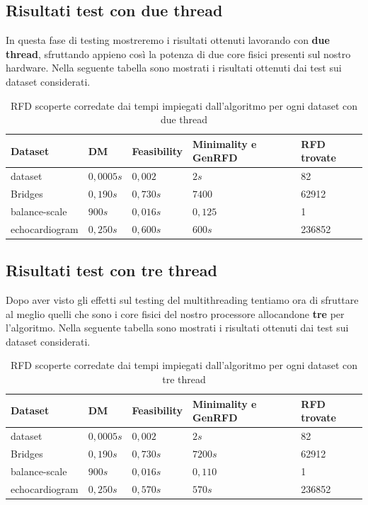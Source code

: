 \subsection{Risultati test con due thread}
In questa fase di testing mostreremo i risultati ottenuti lavorando con \textbf{due thread}, sfruttando appieno così la potenza di due core fisici presenti sul nostro hardware.
Nella seguente tabella sono mostrati i risultati ottenuti dai test sui dataset considerati.
\begin{table}[H]
	\centering
	\begin{tabular}{lllll}
		Dataset & DM & Feasibility & Minimality e GenRFD & RFD trovate \\
		\hline
		dataset& $0,0005s$ & $0,002$ & $2s$ & 82 \\
		Bridges & $0,190s$  & $0,730s$ & $7400$ & 62912 \\
		balance-scale  & $900s$  & $0,016s$ & $0,125$ & 1\\
		echocardiogram  & $0,250s$  & $0,600s$ & $600s$ & 236852\\
		\hline
	\end{tabular}
	\label{risultati_2_thread}
	\caption{RFD scoperte corredate dai tempi impiegati dall'algoritmo per ogni dataset con due thread}
\end{table}
\subsection{Risultati test con tre thread}
Dopo aver visto gli effetti sul testing del multithreading tentiamo ora di sfruttare al meglio quelli che sono i core fisici del nostro processore allocandone \textbf{tre} per l'algoritmo.
Nella seguente tabella sono mostrati i risultati ottenuti dai test sui dataset considerati.
\begin{table}[H]
	\centering
	\begin{tabular}{lllll}
		Dataset & DM & Feasibility & Minimality e GenRFD & RFD trovate \\
		\hline
		dataset& $0,0005s$ & $0,002$ & $2s$ & 82 \\
		Bridges & $0,190s$  & $0,730s$ & $7200s$ & 62912 \\
		balance-scale  & $900s$  & $0,016s$ & $0,110$ & 1\\
		echocardiogram  & $0,250s$  & $0,570s$ & $570s$ & 236852\\
		\hline
	\end{tabular}
	\label{risultati_3_thread}
	\caption{RFD scoperte corredate dai tempi impiegati dall'algoritmo per ogni dataset con tre thread}
\end{table}
